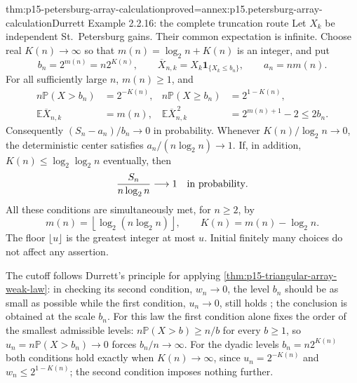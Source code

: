 \begin{hbtheorem}{thm:p15-petersburg-array-calculation}{proved=annex:p15.petersburg-array-calculation}{Durrett Example 2.2.16: the complete truncation route}
Let \(X_k\) be independent St.~Petersburg gains.
Their common expectation is infinite. Choose real \(K(n)\to\infty\)
so that \(m(n)=\log_2 n+K(n)\) is an integer, and put
\[
 b_n=2^{m(n)}=n2^{K(n)},\qquad
 \overline X_{n,k}=X_k\mathbf1_{\{X_k\leq b_n\}},\qquad
 a_n=nm(n).
\]
For all sufficiently large \(n\), \(m(n)\geq1\), and
\[
 \begin{aligned}
 n\mathbb P(X>b_n)&=2^{-K(n)},&
 n\mathbb P(X\geq b_n)&=2^{1-K(n)},\\
 \mathbb E\overline X_{n,k}&=m(n),&
 \mathbb E\overline X_{n,k}^{\,2}&=2^{m(n)+1}-2\leq2b_n.
 \end{aligned}
\]
Consequently \((S_n-a_n)/b_n\to0\) in probability.
Whenever \(K(n)/\log_2n\to0\), the deterministic center satisfies
\(a_n/(n\log_2n)\to1\).
If, in addition, \(K(n)\leq\log_2\log_2n\) eventually, then
\[
 \frac{S_n}{n\log_2n}\longrightarrow1
                                      \quad\hbox{in probability}.
\]
All these conditions are simultaneously met, for \(n\geq2\), by
\[
 m(n)=\left\lfloor\log_2(n\log_2n)\right\rfloor,\qquad
 K(n)=m(n)-\log_2n.
\]
The floor \(\lfloor u\rfloor\) is the greatest integer at most \(u\).
Initial finitely many choices do not affect any assertion.

The cutoff follows Durrett's principle for applying
\cref{thm:p15-triangular-array-weak-law}: in checking its second
condition, \(w_n\to0\), the level \(b_n\) should be as small as possible
while the first condition, \(u_n\to0\), still holds
\cite[p.~65]{DurrettPTEAuthor2019}; the conclusion is obtained at the
scale \(b_n\). For this law the first condition alone fixes the order
of the smallest admissible levels: \(n\mathbb P(X>b)\geq n/b\) for every
\(b\geq1\), so \(u_n=n\mathbb P(X>b_n)\to0\) forces \(b_n/n\to\infty\).
For the dyadic levels \(b_n=n2^{K(n)}\) both conditions hold exactly
when \(K(n)\to\infty\), since \(u_n=2^{-K(n)}\) and
\(w_n\leq2^{1-K(n)}\); the second condition imposes nothing further.
\end{hbtheorem}

